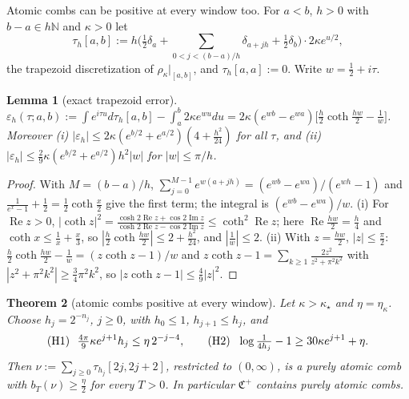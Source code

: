 \documentclass[11pt]{amsart}
\newtheorem{theorem}{Theorem}[section]
\newtheorem{lemma}[theorem]{Lemma}
\theoremstyle{definition}
\theoremstyle{remark}
\newcommand{\N}{\mathbb N}
\newcommand{\Rel}{\operatorname{Re}}
\newcommand{\Iml}{\operatorname{Im}}
\begin{document}
Atomic combs can be positive at every window too. For $a<b$, $h>0$ with $b-a\in h\N$ and $\kappa>0$ let
\[
\tau_h[a,b]:=h\Big(\tfrac12\delta_a+\sum_{0<j<(b-a)/h}\delta_{a+jh}+\tfrac12\delta_b\Big)\cdot2\kappa e^{u/2},
\]
the trapezoid discretization of $\rho_\kappa|_{[a,b]}$, and $\tau_h[a,a]:=0$. Write $w=\frac12+i\tau$.

\begin{lemma}[exact trapezoid error]\label{lem:trap}
$\varepsilon_h(\tau;a,b):=\int e^{i\tau u}d\tau_h[a,b]-\int_a^b2\kappa e^{wu}du=2\kappa(e^{wb}-e^{wa})\big[\frac h2\coth\frac{hw}2-\frac1w\big]$. Moreover
\emph{(i)} $|\varepsilon_h|\le2\kappa(e^{b/2}+e^{a/2})(4+\frac{h^2}{24})$ for all $\tau$, and
\emph{(ii)} $|\varepsilon_h|\le\frac29\kappa(e^{b/2}+e^{a/2})h^2|w|$ for $|w|\le\pi/h$.
\end{lemma}

\begin{proof}
With $M=(b-a)/h$, $\sum_{j=0}^{M-1}e^{w(a+jh)}=(e^{wb}-e^{wa})/(e^{wh}-1)$ and $\frac1{e^x-1}+\frac12=\frac12\coth\frac x2$ give the
first term; the integral is $(e^{wb}-e^{wa})/w$. (i) For $\Rel z>0$, $|\coth z|^2=\frac{\cosh2\Rel z+\cos2\Iml z}{\cosh2\Rel z-\cos2\Iml z}\le\coth^2\Rel z$;
here $\Rel\frac{hw}2=\frac h4$ and $\coth x\le\frac1x+\frac x3$, so $|\frac h2\coth\frac{hw}2|\le2+\frac{h^2}{24}$, and $|\frac1w|\le2$.
(ii) With $z=\frac{hw}2$, $|z|\le\frac\pi2$: $\frac h2\coth\frac{hw}2-\frac1w=(z\coth z-1)/w$ and
$z\coth z-1=\sum_{k\ge1}\frac{2z^2}{z^2+\pi^2k^2}$ with $|z^2+\pi^2k^2|\ge\frac34\pi^2k^2$, so $|z\coth z-1|\le\frac49|z|^2$.
\end{proof}

\begin{theorem}[atomic combs positive at every window]\label{thm:atomic}
Let $\kappa>\kappa_\star$ and $\eta=\eta_\kappa$. Choose $h_j=2^{-n_j}$, $j\ge0$, with $h_0\le1$, $h_{j+1}\le h_j$, and
\[
\textup{(H1)}\ \ \tfrac{4\pi}9\kappa e^{j+1}h_j\le\eta\,2^{-j-4},\qquad
\textup{(H2)}\ \ \log\tfrac1{4h_j}-1\ge30\kappa e^{j+1}+\eta .
\]
Then $\nu:=\sum_{j\ge0}\tau_{h_j}[2j,2j+2]$, restricted to $(0,\infty)$, is a purely atomic comb with $b_T(\nu)\ge\frac\eta2$ for
every $T>0$. In particular $\mathfrak C^+$ contains purely atomic combs.
\end{theorem}
\end{document}

